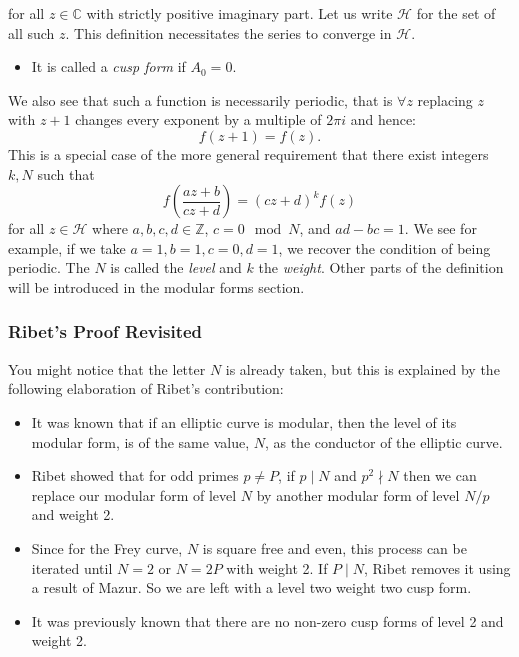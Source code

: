 \documentclass{article}
\theoremstyle{definition}
\theoremstyle{definition}
\theoremstyle{definition}
\newcommand{\C}{\mathbb{C}}
\newcommand{\Z}{\mathbb{Z}}
\begin{document}
for all $z\in\C$ with strictly positive imaginary part. Let us write $\mathcal{H}$ for the set of all such $z$. This definition necessitates the series to converge in $\mathcal{H}$.%
\begin{itemize}
    \item It is called a \emph{cusp form} if $A_0=0$.
\end{itemize}

We also see that such a function is necessarily periodic, that is $\forall z$ replacing $z$ with $z+1$ changes every exponent by a multiple of $2\pi i$ and hence:
$$f(z+1)=f(z).$$
This is a special case of the more general requirement that there exist integers $k,N$ such that
$$f\left(\frac{az+b}{cz+d}\right)=(cz+d)^kf(z)$$
for all $z\in \mathcal{H}$ where $a,b,c,d\in\Z$, $c=0\mod N$, and  $ad-bc=1$.
\newline \newline
We see for example, if we take $a=1,b=1,c=0,d=1$, we recover the condition of being periodic.
\newline \newline
The $N$ is called the \emph{level} and $k$ the \emph{weight}. Other parts of the definition will be introduced in the modular forms section.

\subsubsection{Ribet's Proof Revisited}
You might notice that the letter $N$ is already taken, but this is explained by the following elaboration of Ribet's contribution:
\begin{itemize}
    \item It was known that if an elliptic curve is modular, then the level of its modular form, is of the same value, $N$, as the conductor of the elliptic curve.

    \item Ribet showed that for odd primes $p\neq P$, if $p\mid N$ and $p^2 \nmid N$ then we can replace our modular form of level $N$ by another modular form of level $N/p$ and weight 2. 

    \item Since for the Frey curve, $N$ is square free and even, this process can be iterated until $N=2$ or $N=2P$ with weight 2. If $P\mid N$, Ribet removes it using a result of Mazur. So we are left with a level two weight two cusp form.

    \item It was previously known that there are no non-zero cusp forms of level 2 and weight 2. %

\end{itemize}
\end{document}
